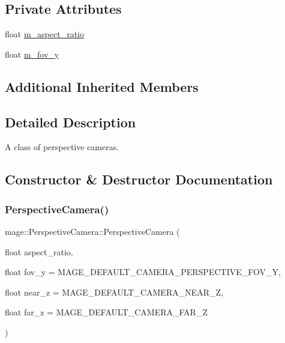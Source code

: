 \subsection*{Private Attributes}
\begin{DoxyCompactItemize}
\item 
float \hyperlink{classmage_1_1_perspective_camera_ab92d993fece777cfeca8d5c7d371ffc9}{m\+\_\+aspect\+\_\+ratio}
\item 
float \hyperlink{classmage_1_1_perspective_camera_abdcf1a0cdd247e0f7e14e70898678af6}{m\+\_\+fov\+\_\+y}
\end{DoxyCompactItemize}
\subsection*{Additional Inherited Members}


\subsection{Detailed Description}
A class of perspective cameras. 

\subsection{Constructor \& Destructor Documentation}
\hypertarget{classmage_1_1_perspective_camera_a118a233aa484bbff31032703087a5a8c}{}\label{classmage_1_1_perspective_camera_a118a233aa484bbff31032703087a5a8c} 
\subsubsection{\texorpdfstring{Perspective\+Camera()}{PerspectiveCamera()}\hspace{0.1cm}{\footnotesize\ttfamily [1/4]}}
{\footnotesize\ttfamily mage\+::\+Perspective\+Camera\+::\+Perspective\+Camera (\begin{DoxyParamCaption}\item[{float}]{aspect\+\_\+ratio,  }\item[{float}]{fov\+\_\+y = {\ttfamily MAGE\+\_\+DEFAULT\+\_\+CAMERA\+\_\+PERSPECTIVE\+\_\+FOV\+\_\+Y},  }\item[{float}]{near\+\_\+z = {\ttfamily MAGE\+\_\+DEFAULT\+\_\+CAMERA\+\_\+NEAR\+\_\+Z},  }\item[{float}]{far\+\_\+z = {\ttfamily MAGE\+\_\+DEFAULT\+\_\+CAMERA\+\_\+FAR\+\_\+Z} }\end{DoxyParamCaption})\hspace{0.3cm}{\ttfamily [explicit]}}

